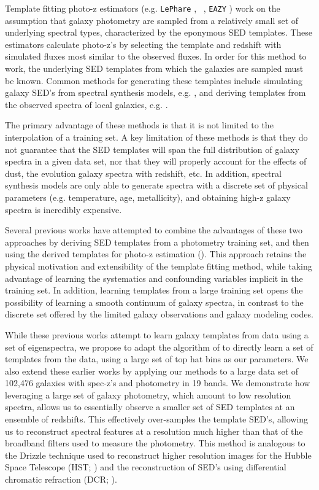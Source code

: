 Template fitting photo-z estimators (e.g. \texttt{LePhare} \citealt{Arnouts1999}, \bpz\ \citealt{Benitez2000a}, \texttt{EAZY} \citealt{Brammer2008}) work on the assumption that galaxy photometry are sampled from a relatively small set of underlying spectral types, characterized by the eponymous SED templates. 
These estimators calculate photo-z's by selecting the template and redshift with simulated fluxes most similar to the observed fluxes. 
In order for this method to work, the underlying SED templates from which the galaxies are sampled must be known. 
Common methods for generating these templates include simulating galaxy SED's from spectral synthesis models, e.g. \citet{BruzualA.1993a}, and deriving templates from the observed spectra of local galaxies, e.g. \citet{Benitez2004a}. 

The primary advantage of these methods is that it is not limited to the interpolation of a training set. 
A key limitation of these methods is that they do not guarantee that the SED templates will span the full distribution of galaxy spectra in a given data set, nor that they will properly account for the effects of dust, the evolution galaxy spectra with redshift, etc.
In addition, spectral synthesis models are only able to generate spectra with a discrete set of physical parameters (e.g. temperature, age, metallicity), and obtaining high-z galaxy spectra is incredibly expensive.

Several previous works have attempted to combine the advantages of these two approaches by deriving SED templates from a photometry training set, and then using the derived templates for photo-z estimation (\citealt{Budavari2000b,Csabai2000,Kalmbach2017}).
This approach retains the physical motivation and extensibility of the template fitting method, while taking advantage of learning the systematics and confounding variables implicit in the training set.
In addition, learning templates from a large training set opens the possibility of learning a smooth continuum of galaxy spectra, in contrast to the discrete set offered by the limited galaxy observations and galaxy modeling codes.

While these previous works attempt to learn galaxy templates from data using a set of eigenspectra, we propose to adapt the algorithm of \citet{Budavari2000b} to directly learn a set of templates from the data, using a large set of top hat bins as our parameters.
We also extend these earlier works by applying our methods to a large data set of 102,476 galaxies with spec-z's and photometry in 19 bands.
We demonstrate how leveraging a large set of galaxy photometry, which amount to low resolution spectra, allows us to essentially observe a smaller set of SED templates at an ensemble of redshifts.
This effectively over-samples the template SED's, allowing us to reconstruct spectral features at a resolution much higher than that of the broadband filters used to measure the photometry.
This method is analogous to the Drizzle technique used to reconstruct higher resolution images for the Hubble Space Telescope (HST; \citealt{Fruchter2002}) and the reconstruction of SED's using differential chromatic refraction (DCR; \citealt{Lee2019}).

